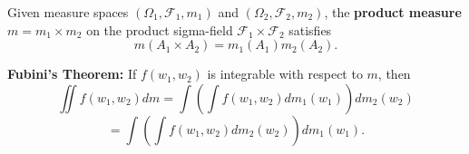 Given measure spaces $(\Omega_1, \mathcal{F}_1, m_1)$ and $(\Omega_2, \mathcal{F}_2, m_2)$, the \textbf{product measure} $m = m_1 \times m_2$ on the product sigma-field $\mathcal{F}_1 \times \mathcal{F}_2$ satisfies
$$m(A_1 \times A_2) = m_1(A_1) m_2(A_2).$$

\textbf{Fubini's Theorem:} If $f(w_1, w_2)$ is integrable with respect to $m$, then
$$\iint f(w_1, w_2) dm = \int \left(\int f(w_1, w_2) dm_1(w_1)\right) dm_2(w_2)$$
$$= \int \left(\int f(w_1, w_2) dm_2(w_2)\right) dm_1(w_1).$$
